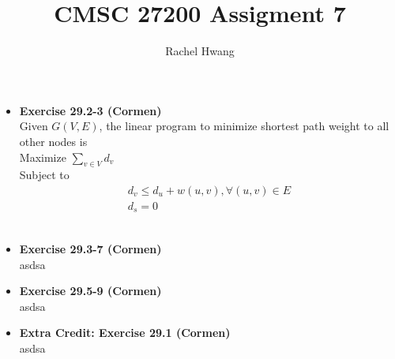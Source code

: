 \documentclass[a4paper]{article}
\title{CMSC 27200 Assigment 7}
\author{Rachel Hwang}
\begin{document}
\maketitle

\begin{itemize}

\item{\textbf{Exercise 29.2-3 (Cormen)}} \\
Given $G(V, E)$, the linear program to minimize shortest path weight to  all other nodes is \\
Maximize $\sum_{v \in V} d_v$ \\
Subject to   \begin{align*}
d_v \leq d_u + w(u, v), \forall (u, v) \in E \\ 
d_s = 0
\end{align*}
\\

\item{\textbf{Exercise 29.3-7 (Cormen)}} \\
asdsa
\\

\item{\textbf{Exercise 29.5-9 (Cormen)}} \\
asdsa
\\

\item{\textbf{Extra Credit: Exercise 29.1 (Cormen)}} \\
asdsa
\\

\end{itemize}
\end{document}
